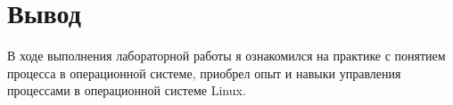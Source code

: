 \section*{Вывод}
В ходе выполнения лабораторной работы я ознакомился на практике с понятием процесса в операционной системе, приобрел опыт и навыки управления процессами в операционной системе Linux.